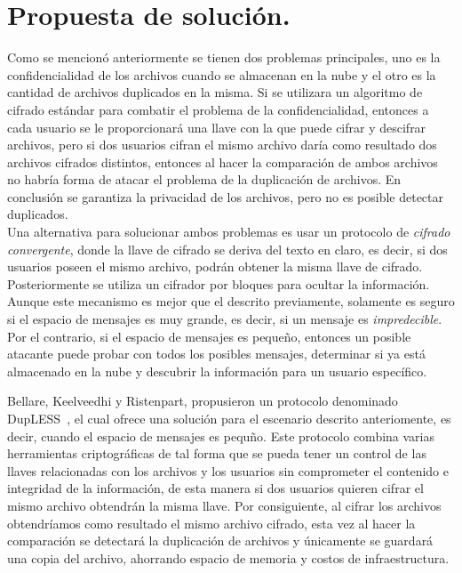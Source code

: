 
\section{Propuesta de solución. }

Como se mencionó anteriormente se tienen dos problemas principales, uno es la confidencialidad de los archivos cuando se almacenan en la nube y el otro es la cantidad de archivos duplicados en la misma. Si se utilizara un algoritmo de cifrado est\'andar para combatir el problema de la confidencialidad, entonces a cada usuario se le proporcionará una llave con la que puede cifrar y descifrar archivos, pero si dos usuarios cifran el mismo archivo daría como resultado dos archivos cifrados distintos, entonces al hacer la comparación de ambos archivos no habría forma de atacar el problema de la duplicación de archivos. En conclusi\'on se garantiza la privacidad de los archivos, pero no es posible detectar duplicados.\\

Una alternativa para solucionar ambos problemas es usar un protocolo de {\it cifrado convergente}, donde la llave de cifrado se deriva del texto en claro, es decir, si dos usuarios poseen el mismo archivo, podr\'an obtener la misma llave de cifrado. Posteriormente se utiliza un cifrador por bloques para ocultar la informaci\'on. Aunque este mecanismo es mejor que el descrito previamente, solamente es seguro si el espacio de mensajes es muy grande, es decir, si un mensaje es {\it impredecible}. Por el contrario, si el espacio de mensajes es peque\~no, entonces un posible atacante puede probar con todos los posibles mensajes, determinar si ya est\'a almacenado en la nube y descubrir la 
informaci\'on para un usuario espec\'ifico. 

Bellare, Keelveedhi y Ristenpart, propusieron un protocolo denominado DupLESS~\cite{dupless}, el cual ofrece una soluci\'on para el escenario descrito anteriomente, es decir, cuando el espacio de mensajes es pequ\~no. Este protocolo combina varias herramientas criptográficas de tal forma que se pueda tener un control de las llaves relacionadas con los archivos y los usuarios sin comprometer el contenido e integridad de la información, de esta manera si dos usuarios quieren cifrar el mismo archivo obtendrán la misma llave. Por consiguiente, al cifrar los archivos obtendríamos como resultado el mismo archivo cifrado, esta vez al hacer la comparación se detectará la duplicación de archivos y únicamente se guardará una copia del archivo, ahorrando espacio de memoria y costos de infraestructura. \\

